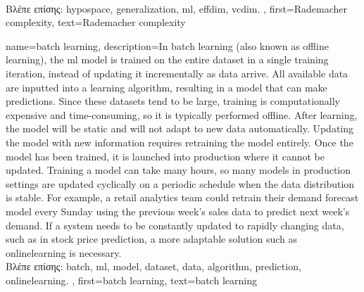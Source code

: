 {{%
		\\
		\foreignlanguage{greek}{Βλέπε επίσης:} \gls{hypospace}, \gls{generalization}, \gls{ml}, \gls{effdim}, \gls{vcdim}. },
	first={Rademacher complexity},
	text={Rademacher complexity}  
}

{name={batch learning},
	description={In \gls{batch} learning (also known as offline learning), the \gls{ml} \gls{model} 
		is trained on the entire \gls{dataset} in a single training iteration, instead of updating it incrementally as \gls{data} arrive. 
		All available \gls{data} are inputted into a learning \gls{algorithm}, resulting in a \gls{model} that can make \gls{prediction}s. 
		Since these \gls{dataset}s tend to be large, training is computationally expensive and time-consuming, 
		so it is typically performed offline. After learning, the \gls{model} will be static and will not adapt to new \gls{data} automatically. 
		Updating the \gls{model} with new information requires retraining the \gls{model} entirely. Once the \gls{model} has been trained, 
		it is launched into production where it cannot be updated. Training a \gls{model} can take many hours, so many \gls{model}s in production 
		settings are updated cyclically on a periodic schedule when the \gls{data} distribution is stable. For example, a retail analytics team 
		could retrain their demand forecast \gls{model} every Sunday using the previous week's sales \gls{data} to predict next week's demand. 
		If a system needs to be constantly updated to rapidly changing \gls{data}, such as in stock price \gls{prediction}, a more adaptable solution 
		such as \gls{onlinelearning} is necessary. \\
		\foreignlanguage{greek}{Βλέπε επίσης:} \gls{batch}, \gls{ml}, \gls{model}, \gls{dataset}, \gls{data}, \gls{algorithm}, \gls{prediction}, 
		\gls{onlinelearning}. },
	first={batch learning}, 
	text={batch learning}
}

